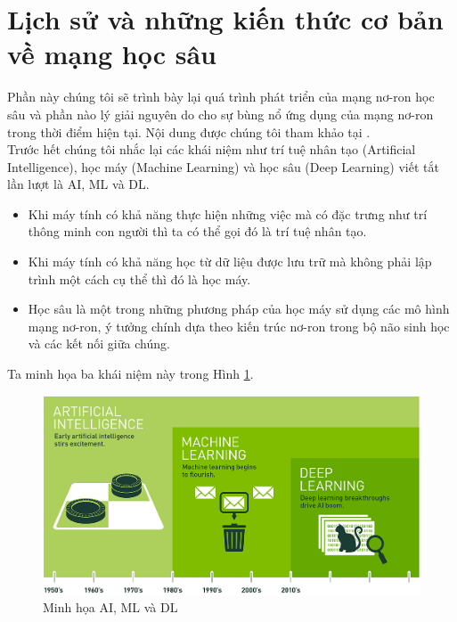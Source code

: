 \section{Lịch sử và những kiến thức cơ bản về mạng học sâu}
Phần này chúng tôi sẽ trình bày lại quá trình phát triển của mạng nơ-ron học sâu và phần nào lý giải nguyên do cho sự bùng nổ ứng dụng của mạng nơ-ron trong thời điểm hiện tại. Nội dung được chúng tôi tham khảo tại \cite{basicdeep}.\\
Trước hết chúng tôi nhắc lại các khái niệm như trí tuệ nhân tạo (Artificial Intelligence), học máy (Machine Learning) và học sâu (Deep Learning) viết tắt lần lượt là AI, ML và DL.
\begin{itemize}
    \item Khi máy tính có khả năng thực hiện những việc mà có đặc trưng như trí thông minh con người thì ta có thể gọi đó là trí tuệ nhân tạo.
    \item Khi máy tính có khả năng học từ dữ liệu được lưu trữ mà không phải lập trình một cách cụ thể thì đó là học máy.
    \item Học sâu là một trong những phương pháp của học máy sử dụng các mô hình mạng nơ-ron, ý tưởng chính dựa theo kiến trúc nơ-ron trong bộ não sinh học và các kết nối giữa chúng.
\end{itemize}
 Ta minh họa ba khái niệm này trong Hình \ref{history}.

\begin{figure}[ht]
\centering
        \includegraphics[totalheight=8cm]{Images/history.png}
    \caption{Minh họa AI, ML và DL\cite{basicai}}
    \label{history}
\end{figure}

